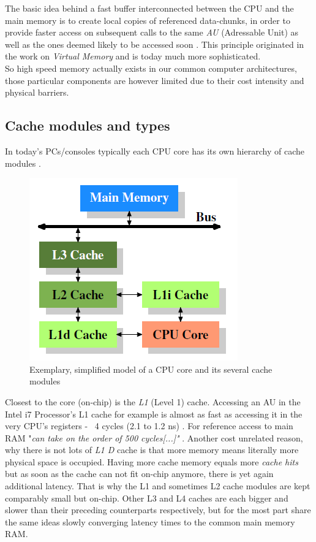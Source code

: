The basic idea behind a fast buffer interconnected between the CPU and the main memory is to create local copies of referenced data-chunks, in order to provide faster access on subsequent calls to the same \textit{AU} (Adressable Unit) as well as the ones deemed likely to be accessed soon . This principle originated in the work on \textit{Virtual Memory}  and is today much more sophisticated.\\
So high speed memory actually exists in our common computer architectures, those particular components are however limited due to their cost intensity and physical barriers.

\subsection{Cache modules and types}
In today's PCs/consoles typically each CPU core has its own hierarchy of cache modules .
\begin{figure}[!htbp]
	\centering
	\includegraphics[width=0.4\linewidth]{PICs/cachelayout}
	\caption{Exemplary, simplified model of a CPU core and its several cache modules }\label{cache_layout}
\end{figure}
Closest to the core (on-chip) is the \textit{L1} (Level 1) cache. Accessing an AU in the  Intel i7 Processor's L1 cache for example is almost as fast as accessing it in the very CPU's registers - ~4 cycles (2.1 to 1.2 ns) . For reference access to main RAM "\textit{can take on the order of 500 cycles[...]"} .
Another cost unrelated reason, why there is not lots of \textit{L1 D} cache is that more memory means literally more physical space is occupied. Having more cache memory equals more \textit{cache hits}  but as soon as the cache can not fit on-chip anymore, there is yet again additional latency. That is why the L1 and sometimes L2 cache modules are kept comparably small but on-chip. Other L3 and L4 caches are each bigger and slower than their preceding counterparts respectively, but for the most part share the same ideas slowly converging latency times to the common main memory RAM.\\
